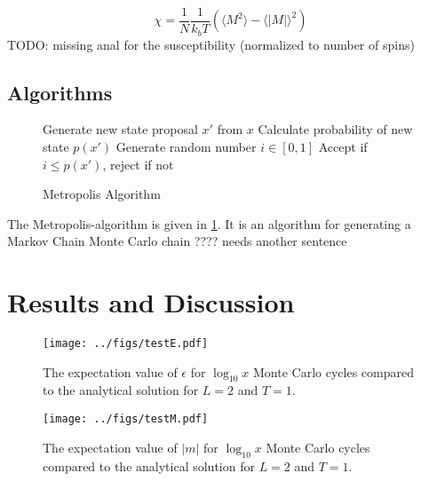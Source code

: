 \documentclass[english,notitlepage,reprint,nofootinbib]{revtex4-1}  %
\begin{document}
\begin{equation}
	\chi = \frac{1}{N}\frac{1}{k_bT}\left(\langle M^2\rangle - \langle |M|\rangle^2\right)
\end{equation}
TODO: missing anal for the susceptibility (normalized to number of spins)



\subsection*{Algorithms}

\begin{figure}
	\begin{algorithm}[H]
		\caption{Metropolis Algorithm}
		\label{algo:metropolis}
		\begin{algorithmic}
			\State Generate new state proposal $x'$ from $x$
			\State Calculate probability of new state $p(x')$
			\State Generate random number  $i \in [0,1]$
			\State Accept if $i \leq p(x')$, reject if not
			\EndProcedure
		\end{algorithmic}
	\end{algorithm}
\end{figure}

The Metropolis-algorithm is given in \ref{algo:metropolis}. It is an algorithm for generating a Markov Chain Monte Carlo chain ???? needs another sentence
\section{Results and Discussion}\label{sec:results}

\begin{figure}[H]
	\centering
	\texttt{[image: ../figs/testE.pdf]} %
	\caption{The expectation value of $\epsilon$ for $\log_{10} x$ Monte Carlo cycles compared to the analytical solution for $L=2$ and $T=1$.}
	\label{fig:testE}
\end{figure}

\begin{figure}[H]
	\centering
	\texttt{[image: ../figs/testM.pdf]} %
	\caption{The expectation value of $|m|$ for $\log_{10} x$ Monte Carlo cycles compared to the analytical solution for $L=2$ and $T=1$.}
	\label{fig:testM}
\end{figure}
\end{document}
